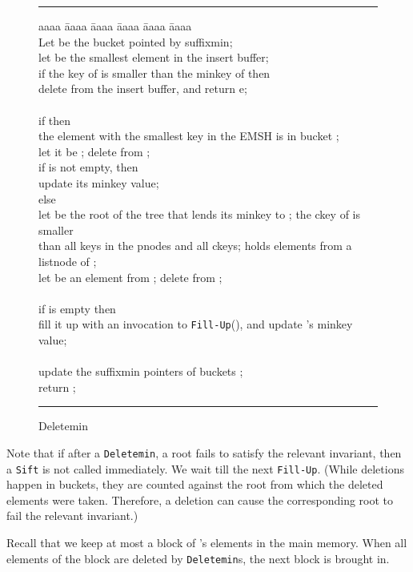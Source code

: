 \begin{figure}
\vspace{0.2in}
\hrule
\begin{tabbing}
aaaa \= aaaa \= aaaa \= aaaa \= aaaa \= aaaa \kill \\
Let  be the bucket pointed by suffixmin; \\
let  be the smallest element in the insert buffer; \\
if the key of  is smaller than the minkey of  then \\
	\> delete  from the insert buffer, and return e; \\
\\
if  then \\
	\> the element with the smallest key in the EMSH is in bucket ; \\
	\> let it be ; delete  from ; \\
	\> if  is not empty, then \\ 
	\>	\> update its minkey value; \\

else \\
	\> let  be the root of the tree  that lends its minkey to ; the ckey of  is smaller \\
	\> than all keys in the pnodes and all ckeys;  holds elements from a listnode  of ;\\
	\> let  be an element from ;  delete  from ; \\
\\
if  is empty then \\
	\> fill it up with an invocation to {\tt Fill-Up}(), and update 's minkey value; \\
\\
update the suffixmin pointers of buckets ; \\ 
return ; 
\end{tabbing}
\vspace{0.1in}
\hrule
\vspace{0.2in}
\caption{Deletemin}
\label{fig:deletemin}
\end{figure}

Note that if after a {\tt Deletemin}, a root fails to satisfy the relevant invariant,
then a {\tt Sift} is not called immediately. We wait till the next {\tt Fill-Up}.
(While deletions happen in buckets, they are counted against the root from which
the deleted elements were taken. Therefore, a deletion can cause the corresponding root
to fail the relevant invariant.)
 
Recall that we keep at most a block of 's elements in the main memory.
When all elements of the block are deleted by {\tt Deletemin}s, the next block is
	brought in.

